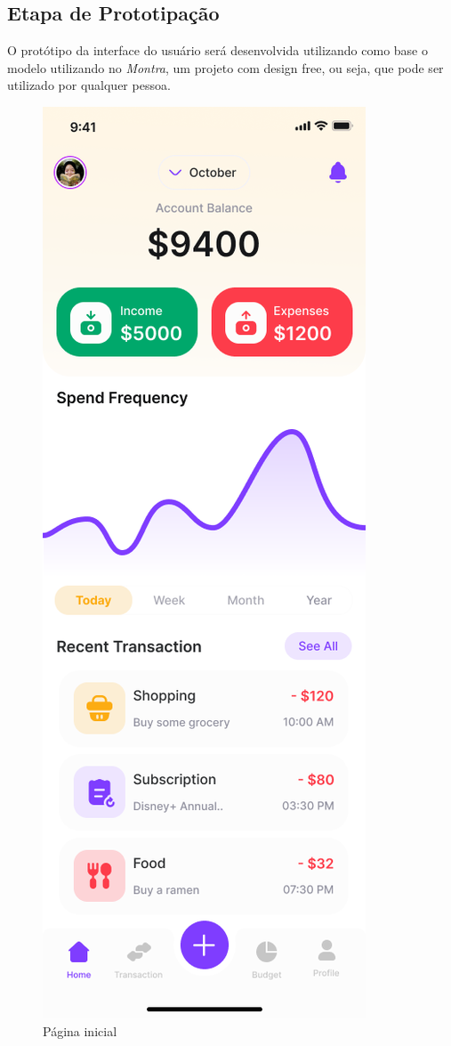 \subsection{Etapa de Prototipação}

O protótipo da interface do usuário será desenvolvida utilizando como base o modelo utilizando no \textit{Montra}, um projeto com design free, ou seja, que pode ser utilizado por qualquer pessoa.

\begin{figure}[!htb]
    \centering
    \caption{Página inicial}
    \includegraphics[scale=0.3]{images/Home.png}
\end{figure}

